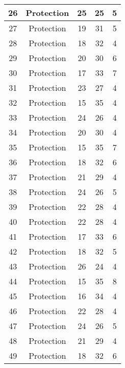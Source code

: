 \documentclass[results.tex]{subfiles}
\begin{document}
\begin{center}
\begin{tabular}{| c || c | c | c | c |}
    \hline
    26 & Protection & 25 & 25 & 5 \\ 
    \hline
    27 & Protection & 19 & 31 & 5 \\ 
    \hline
    28 & Protection & 18 & 32 & 4 \\ 
    \hline
    29 & Protection & 20 & 30 & 6 \\ 
    \hline
    30 & Protection & 17 & 33 & 7 \\ 
    \hline
    31 & Protection & 23 & 27 & 4 \\ 
    \hline
    32 & Protection & 15 & 35 & 4 \\ 
    \hline
    33 & Protection & 24 & 26 & 4 \\ 
    \hline
    34 & Protection & 20 & 30 & 4 \\ 
    \hline
    35 & Protection & 15 & 35 & 7 \\ 
    \hline
    36 & Protection & 18 & 32 & 6 \\ 
    \hline
    37 & Protection & 21 & 29 & 4 \\ 
    \hline
    38 & Protection & 24 & 26 & 5 \\ 
    \hline
    39 & Protection & 22 & 28 & 4 \\ 
    \hline
    40 & Protection & 22 & 28 & 4 \\ 
    \hline
    41 & Protection & 17 & 33 & 6 \\ 
    \hline
    42 & Protection & 18 & 32 & 5 \\ 
    \hline
    43 & Protection & 26 & 24 & 4 \\ 
    \hline
    44 & Protection & 15 & 35 & 8 \\ 
    \hline
    45 & Protection & 16 & 34 & 4 \\ 
    \hline
    46 & Protection & 22 & 28 & 4 \\ 
    \hline
    47 & Protection & 24 & 26 & 5 \\ 
    \hline
    48 & Protection & 21 & 29 & 4 \\ 
    \hline
    49 & Protection & 18 & 32 & 6 \\ 
    \hline   \end{tabular}
\end{center}
\end{document}
